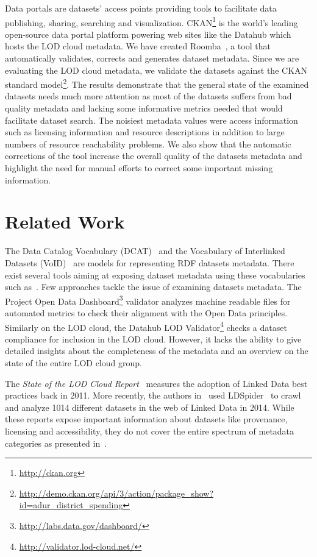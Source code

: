 \documentclass[runningheads,a4paper]{../../Util/LaTEX/llncs}
\begin{document}
Data portals are datasets' access points providing tools to facilitate data publishing, sharing, searching and visualization. CKAN\footnote{\url{http://ckan.org}} is the world's leading open-source data portal platform powering web sites like the Datahub which hosts the LOD cloud metadata. We have created Roomba~\cite{Assaf:WWW:15}, a tool that automatically validates, corrects and generates dataset metadata. Since we are evaluating the LOD cloud metadata, we validate the datasets against the CKAN standard model\footnote{\url{http://demo.ckan.org/api/3/action/package_show?id=adur_district_spending}}. The results demonstrate that the general state of the examined datasets needs much more attention as most of the datasets suffers from bad quality metadata and lacking some informative metrics needed that would facilitate dataset search. The noisiest metadata values were access information such as licensing information and resource descriptions in addition to large numbers of resource reachability problems. We also show that the automatic corrections of the tool increase the overall quality of the datasets metadata and highlight the need for manual efforts to correct some important missing information.


\section{Related Work}
\label{sec:related-work}
The Data Catalog Vocabulary (DCAT)~\cite{Erickson:DCV:14} and the Vocabulary of Interlinked Datasets (VoID)~\cite{Cyganiak:W3C:11} are models for representing RDF datasets metadata. There exist several tools aiming at exposing dataset metadata using these vocabularies such as~\cite{Bohm:WebSemJournal:11}.
Few approaches tackle the issue of examining datasets metadata. The Project Open Data Dashboard\footnote{\url{http://labs.data.gov/dashboard/}} validator analyzes machine readable files for automated metrics to check their alignment with the Open Data principles. Similarly on the LOD cloud, the Datahub LOD Validator\footnote{\url{http://validator.lod-cloud.net/}} checks a dataset compliance for inclusion in the LOD cloud. However, it lacks the ability to give detailed insights about the completeness of the metadata and an overview on the state of the entire LOD cloud group.

The \textit{State of the LOD Cloud Report}~\cite{Jentzsch:SOLOD:11} measures the adoption of Linked Data best practices back in 2011. More recently, the authors in~\cite{Schmachtenberg:ISWC:14} used LDSpider~\cite{Isele:ISWC:10} to crawl and analyze 1014 different datasets in the web of Linked Data in 2014. While these reports expose important information about datasets like provenance, licensing and accessibility, they do not cover the entire spectrum of metadata categories as presented in~\cite{Zaveri:SemWebJorunal:12}.
\end{document}
